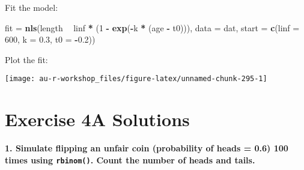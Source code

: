 \documentclass[]{book}
\newenvironment{Shaded}{\begin{snugshade}}{\end{snugshade}}
\newcommand{\KeywordTok}[1]{\textcolor[rgb]{0.13,0.29,0.53}{\textbf{#1}}}
\newcommand{\DataTypeTok}[1]{\textcolor[rgb]{0.13,0.29,0.53}{#1}}
\newcommand{\DecValTok}[1]{\textcolor[rgb]{0.00,0.00,0.81}{#1}}
\newcommand{\FloatTok}[1]{\textcolor[rgb]{0.00,0.00,0.81}{#1}}
\newcommand{\StringTok}[1]{\textcolor[rgb]{0.31,0.60,0.02}{#1}}
\newcommand{\OperatorTok}[1]{\textcolor[rgb]{0.81,0.36,0.00}{\textbf{#1}}}
\newcommand{\NormalTok}[1]{#1}
\theoremstyle{definition}
\theoremstyle{definition}
\theoremstyle{definition}
\theoremstyle{remark}
\begin{document}
Fit the model:

\begin{Shaded}
\begin{Highlighting}[]
\NormalTok{fit =}\StringTok{ }\KeywordTok{nls}\NormalTok{(length }\OperatorTok{~}\StringTok{ }\NormalTok{linf }\OperatorTok{*}\StringTok{ }\NormalTok{(}\DecValTok{1} \OperatorTok{-}\StringTok{ }\KeywordTok{exp}\NormalTok{(}\OperatorTok{-}\NormalTok{k }\OperatorTok{*}\StringTok{ }\NormalTok{(age }\OperatorTok{-}\StringTok{ }\NormalTok{t0))),}
          \DataTypeTok{data =}\NormalTok{ dat, }\DataTypeTok{start =} \KeywordTok{c}\NormalTok{(}\DataTypeTok{linf =} \DecValTok{600}\NormalTok{, }\DataTypeTok{k =} \FloatTok{0.3}\NormalTok{, }\DataTypeTok{t0 =} \OperatorTok{-}\FloatTok{0.2}\NormalTok{))}
\end{Highlighting}
\end{Shaded}

Plot the fit:

\begin{Shaded}
\end{Shaded}

\begin{center}\texttt{[image: au-r-workshop\_files/figure-latex/unnamed-chunk-295-1]} \end{center}

\hypertarget{ex4a-answers}{\section*{Exercise 4A
Solutions}\label{ex4a-answers}}

\textbf{1. Simulate flipping an unfair coin (probability of heads = 0.6)
100 times using \texttt{rbinom()}. Count the number of heads and tails.}
\end{document}
